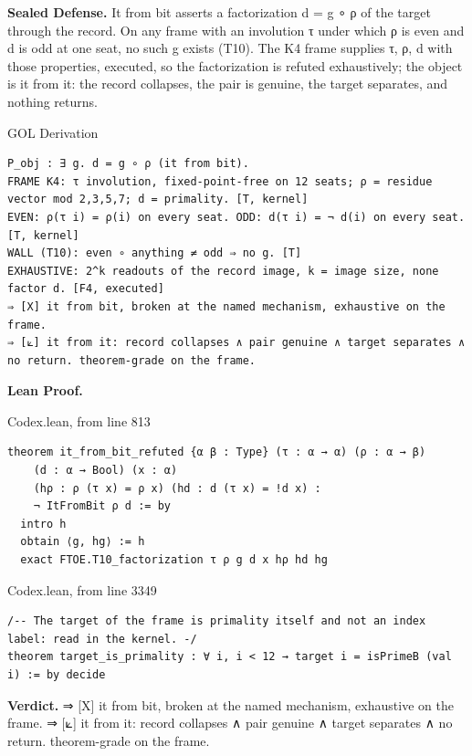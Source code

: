 \documentclass[10pt,twocolumn]{article}
\begin{document}
\textbf{Sealed Defense.} It from bit asserts a factorization d = g ∘ ρ
of the target through the record. On any frame with an involution τ
under which ρ is even and d is odd at one seat, no such g exists (T10).
The K4 frame supplies τ, ρ, d with those properties, executed, so the
factorization is refuted exhaustively; the object is it from it: the
record collapses, the pair is genuine, the target separates, and nothing
returns.

\begin{golbox}{GOL Derivation}
\begin{lstlisting}[style=golv]
P_obj : ∃ g. d = g ∘ ρ (it from bit).
FRAME K4: τ involution, fixed-point-free on 12 seats; ρ = residue vector mod 2,3,5,7; d = primality. [T, kernel]
EVEN: ρ(τ i) = ρ(i) on every seat. ODD: d(τ i) = ¬ d(i) on every seat. [T, kernel]
WALL (T10): even ∘ anything ≠ odd ⇒ no g. [T]
EXHAUSTIVE: 2^k readouts of the record image, k = image size, none factor d. [F4, executed]
⇒ [X] it from bit, broken at the named mechanism, exhaustive on the frame.
⇒ [⟀] it from it: record collapses ∧ pair genuine ∧ target separates ∧ no return. theorem-grade on the frame.
\end{lstlisting}
\end{golbox}

\textbf{Lean Proof.}

\begin{leanexcerpt}{Codex.lean, from line 813}
\begin{lstlisting}[style=leanx,firstnumber=813]
theorem it_from_bit_refuted {α β : Type} (τ : α → α) (ρ : α → β)
    (d : α → Bool) (x : α)
    (hρ : ρ (τ x) = ρ x) (hd : d (τ x) = !d x) :
    ¬ ItFromBit ρ d := by
  intro h
  obtain ⟨g, hg⟩ := h
  exact FTOE.T10_factorization τ ρ g d x hρ hd hg
\end{lstlisting}
\end{leanexcerpt}

\begin{leanexcerpt}{Codex.lean, from line 3349}
\begin{lstlisting}[style=leanx,firstnumber=3349]
/-- The target of the frame is primality itself and not an index label: read in the kernel. -/
theorem target_is_primality : ∀ i, i < 12 → target i = isPrimeB (val i) := by decide
\end{lstlisting}
\end{leanexcerpt}

\textbf{Verdict.} ⇒ {[}X{]} it from bit, broken at the named mechanism,
exhaustive on the frame. ⇒ {[}⟀{]} it from it: record collapses ∧ pair
genuine ∧ target separates ∧ no return. theorem-grade on the frame.
\end{document}
